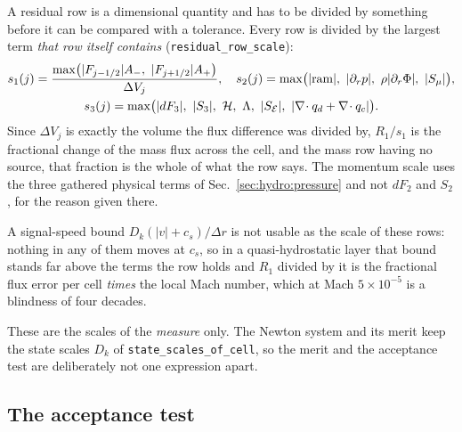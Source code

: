 A residual row is a dimensional quantity and has to be divided by something
before it can be compared with a tolerance.  Every row is divided by the
largest term \emph{that row itself contains}
(\texttt{residual\_row\_scale}):
%
\begin{equation}
  \begin{gathered}
  s_1(j) = \frac{\max\bigl(|F_{j-1/2}|A_-,\ |F_{j+1/2}|A_+\bigr)}{\Delta V_j},
  \quad
  s_2(j) = \max\bigl(|{\rm ram}|,\ |\partial_r p|,\
                     \rho|\partial_r\Phi|,\ |S_\mu|\bigr),
  \\
  s_3(j) = \max\bigl(|dF_3|,\ |S_3|,\ \mathcal{H},\ \Lambda,\
                     |S_{\mathcal{E}}|,\ |\nabla\!\cdot q_d
                     + \nabla\!\cdot q_c|\bigr).
  \end{gathered}
  \label{eq:rowscales}
\end{equation}
%
Since $\Delta V_j$ is exactly the volume the flux difference was divided by,
$R_1/s_1$ is the fractional change of the mass flux across the cell, and the
mass row having no source, that fraction is the whole of what the row says.
The momentum scale uses the three gathered physical terms of
Sec.~\ref{sec:hydro:pressure} and not $dF_2$ and $S_2$, for the reason given
there.

A signal-speed bound $D_k(|v|+c_s)/\Delta r$ is not usable as the scale of
these rows: nothing in any of them moves at $c_s$, so in a quasi-hydrostatic
layer that bound stands far above the terms the row holds and $R_1$ divided by
it is the fractional flux error per cell \emph{times} the local Mach number,
which at Mach $5\times10^{-5}$ is a blindness of four decades.

These are the scales of the \emph{measure} only.  The Newton system and its
merit keep the state scales $D_k$ of \texttt{state\_scales\_of\_cell}, so the
merit and the acceptance test are deliberately not one expression apart.

\subsection{The acceptance test}
\label{sec:steady:gates}

